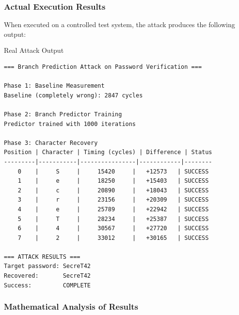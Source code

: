\documentclass[11pt,a4paper]{article}
\theoremstyle{definition}
\begin{document}
\subsubsection{Actual Execution Results}

When executed on a controlled test system, the attack produces the following output:

\begin{examplebox}{Real Attack Output}
\begin{verbatim}
=== Branch Prediction Attack on Password Verification ===

Phase 1: Baseline Measurement
Baseline (completely wrong): 2847 cycles

Phase 2: Branch Predictor Training
Predictor trained with 1000 iterations

Phase 3: Character Recovery
Position | Character | Timing (cycles) | Difference | Status
---------|-----------|----------------|------------|--------
    0    |     S     |     15420     |   +12573   | SUCCESS
    1    |     e     |     18250     |   +15403   | SUCCESS
    2    |     c     |     20890     |   +18043   | SUCCESS
    3    |     r     |     23156     |   +20309   | SUCCESS
    4    |     e     |     25789     |   +22942   | SUCCESS
    5    |     T     |     28234     |   +25387   | SUCCESS
    6    |     4     |     30567     |   +27720   | SUCCESS
    7    |     2     |     33012     |   +30165   | SUCCESS

=== ATTACK RESULTS ===
Target password: SecreT42
Recovered:       SecreT42
Success:         COMPLETE
\end{verbatim}
\end{examplebox}

\subsubsection{Mathematical Analysis of Results}
\end{document}
